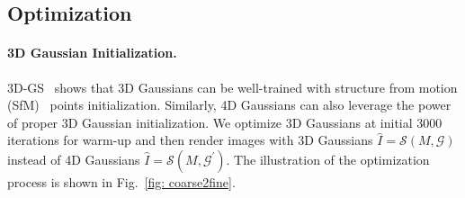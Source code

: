 \documentclass[10pt,twocolumn,letterpaper]{article}
\begin{document}
    
\subsection{Optimization}
\label{subsec:optimization}



\paragraph{3D Gaussian Initialization.}
3D-GS~\cite{3dgs} shows that 3D Gaussians can be well-trained with structure from motion (SfM)~\cite{schonberger2016structure} points initialization. Similarly, 4D Gaussians can also leverage the power of proper 3D Gaussian initialization. We optimize 3D Gaussians at initial 3000 iterations for warm-up and then render images with 3D Gaussians $\hat{I} = \mathcal{S}(M,\mathcal{G})$ instead of 4D Gaussians $\hat{I}=\mathcal{S}(M,\mathcal{G}^\prime)$. The illustration of the optimization process is shown in Fig.~\ref{fig: coarse2fine}.






\end{document}

